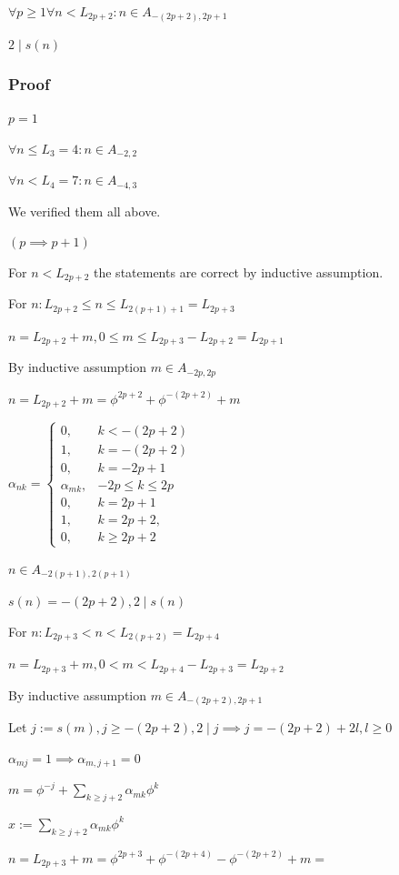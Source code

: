 \documentclass{article}
\begin{document}
$\forall p \geq 1 \forall n < L_{2p+2}: n \in A_{-(2p+2),2p+1}$

$2 \mid s(n)$

\subsubsection*{Proof}

$p = 1$

$\forall n \leq L_3 = 4: n \in A_{-2,2}$

$\forall n < L_4 = 7: n \in A_{-4,3}$

We verified them all above.

$(p \implies p + 1)$

For $n < L_{2p+2}$ the statements are correct by inductive assumption.

For $n: L_{2p+2} \leq n \leq L_{2(p+1) + 1} = L_{2p+3}$

$n = L_{2p+2} + m, 0 \leq m \leq L_{2p+3} - L_{2p+2} = L_{2p+1}$

By inductive assumption $m \in A_{-2p,2p}$

$n = L_{2p+2} + m = \phi^{2p+2} + \phi^{-(2p+2)} + m$

$\alpha_{nk} = \left\{\begin{array}{ll} 0, & k < -(2p+2)\\1, & k = -(2p+2)\\0, & k = -2p+1\\\alpha_{mk}, & -2p \leq k \leq 2p \\ 0, & k = 2p + 1\\ 1, & k = 2p+2, \\ 0, & k \geq 2p + 2 \end{array}\right.$

$n \in A_{-2(p+1),2(p+1)}$

$s(n) = -(2p+2), 2 \mid s(n)$

For $n: L_{2p+3} < n < L_{2(p+2)} = L_{2p+4}$

$n = L_{2p+3} + m, 0 < m < L_{2p+4} - L_{2p+3} = L_{2p+2}$

By inductive assumption $m \in A_{-(2p+2),2p+1}$

Let $j := s(m), j \geq -(2p+2), 2 \mid j \implies j = -(2p+2) + 2l, l \geq 0$

$\alpha_{mj} = 1 \implies \alpha_{m,j+1} = 0$

$m = \phi^{-j} + \sum_{k \geq j + 2} \alpha_{mk} \phi^k$

$x := \sum_{k \geq j + 2} \alpha_{mk} \phi^k$

$n = L_{2p+3} + m = \phi^{2p+3} + \phi^{-(2p+4)} - \phi^{-(2p+2)} + m =$
\end{document}
